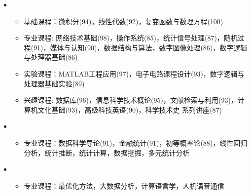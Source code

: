   \begin{itemize}[leftmargin=*]
    \item
      {\small
      \begin{itemize}
        \item{基础课程：微积分(94)，线性代数(92)，复变函数与数理方程(100)}

        \item{专业课程: 网络技术基础(98)，操作系统(85)，统计信号处理(87)，随机过程(91)，媒体与认知(90)，数据结构与算法，数字图像处理(86)，数字逻辑与处理器基础(86)}

        \item{实验课程：MATLAB工程应用(97)，电子电路课程设计(93)，数字逻辑与处理器基础实验(89)}

        \item{兴趣课程: 数据库(96)，信息科学技术概论(95)，文献检索与利用(93)，计算机文化基础(93)，高级科技英语(90)，科学技术史 系列讲座(87)}
      \end{itemize}
      }
    \item
      {\small
      \begin{itemize}
        \item{专业课程：数据科学导论(91)，金融统计(91)，初等概率论(88)，线性回归分析，统计推断，统计计算，数据挖掘，多元统计分析}
      \end{itemize}
      }
    \item
      {\small
      \begin{itemize}
        \item{专业课程：最优化方法，大数据分析，计算语言学，人机语音通信}
      \end{itemize}
      }

    ~\\
  \end{itemize}
